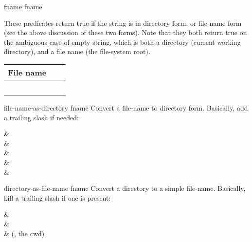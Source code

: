      {fname} \boolean
{} {fname} \boolean
\begin{desc}
These predicates return true if the string is in directory form, or
file-name form (see the above discussion of these two forms).
Note that they both return true on the ambiguous case of empty string,
which is both a directory (current working directory), and a file name 
(the file-system root).
\begin{center}
\begin{tabular}{lll}
File name & \ex{\ldots-directory?} & \ex{\ldots-non-directory?} \\
\hline
\ex{"src/des"}  & \ex{\sharpf} & \ex{\sharpt} \\
\ex{"src/des/"} & \ex{\sharpt} & \ex{\sharpf} \\
\ex{"/"}        & \ex{\sharpt} & \ex{\sharpf} \\
\ex{"."}        & \ex{\sharpf} & \ex{\sharpt} \\
\ex{""}         & \ex{\sharpt} & \ex{\sharpt}
\end{tabular}
\end{center}
\end{desc}

\begin{defundesc} {file-name-as-directory} {fname} \str
    Convert a file-name to directory form.
    Basically, add a trailing slash if needed:
        \begin{exampletable}
          &  \\
         &  \\[2ex]
         &   \\
         &  \\
          & 
        \end{exampletable}
\end{defundesc}

\begin{defundesc} {directory-as-file-name} {fname} \str
    Convert a directory to a simple file-name.
    Basically, kill a trailing slash if one is present:
    \begin{exampletable}
     &  \\[2ex]
     &  \\
      &  (\ie, the cwd) \\
    \end{exampletable}
\end{defundesc}

